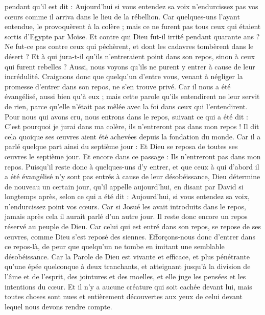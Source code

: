 \begin{multicols}{2}
pendant qu'il est dit : Aujourd'hui si vous entendez sa voix n'endurcissez pas vos cœurs comme il arriva dans le lieu de la rébellion.
Car quelques-uns l'ayant entendue, le provoquèrent à la colère ; mais ce ne furent pas tous ceux qui étaient sortis d'Egypte par Moïse. 
Et contre qui Dieu fut-il irrité pendant quarante ans ? Ne fut-ce pas contre ceux qui péchèrent, et dont les cadavres tombèrent dans le désert ?
Et à qui jura-t-il qu'ils n'entreraient point dans son repos, sinon à ceux qui furent rebelles ?
Aussi, nous voyons qu'ils ne purent y entrer à cause de leur incrédulité.
\VerseOne{}Craignons donc que quelqu'un d'entre vous, venant à négliger la promesse d'entrer dans son repos, ne s'en trouve privé.
Car il nous a été évangélisé, aussi bien qu’à eux ; mais cette parole qu'ils entendirent ne leur servit de rien, parce qu'elle n'était pas mêlée avec la foi dans ceux qui l’entendirent.
Pour nous qui avons cru, nous entrons dans le repos, suivant ce qui a été dit : C'est pourquoi je jurai dans ma colère, ils n’entreront pas dans mon repos ! Il dit cela quoique ses œuvres aient été achevées depuis la fondation du monde.
Car il a parlé quelque part ainsi du septième jour : Et Dieu se reposa de toutes ses œuvres le septième jour.
Et encore dans ce passage : Ils n’entreront pas dans mon repos.
Puisqu'il reste donc à quelques-uns d'y entrer, et que ceux à qui d’abord il a été évangélisé n’y sont pas entrés à cause de leur désobéissance,
Dieu détermine de nouveau un certain jour, qu'il appelle aujourd'hui, en disant par David si longtemps après, selon ce qui a été dit : Aujourd'hui, si vous entendez sa voix, n'endurcissez point vos cœurs.
Car si Josué les avait introduits dans le repos, jamais après cela il aurait parlé d'un autre jour.
Il reste donc encore un repos réservé au peuple de Dieu.
Car celui qui est entré dans son repos, se repose de ses œuvres, comme Dieu s’est reposé des siennes.
Efforçons-nous donc d'entrer dans ce repos-là, de peur que quelqu'un ne tombe en imitant une semblable désobéissance.
Car la Parole de Dieu est vivante et efficace, et plus pénétrante qu’une épée quelconque à deux tranchants, et atteignant jusqu’à la division de l'âme et de l'esprit, des jointures et des moelles, et elle juge les pensées et les intentions du cœur.
Et il n'y a aucune créature qui soit cachée devant lui, mais toutes choses sont nues et entièrement découvertes aux yeux de celui devant lequel nous devons rendre compte.

\end{multicols}
